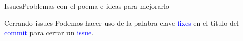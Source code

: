 \documentclass[10pt]{beamer}
\begin{document}
\begin{frame}{Issues}{Problemas con el poema e ideas para mejorarlo}

\begin{block}{Cerrando issues}
Podemos hacer uso de la palabra clave \textcolor{blue}{fixes} en el titulo del \textcolor{blue}{commit} para cerrar un \textcolor{blue}{issue}.

\begin{columns}[c]
\column{1.2in}
\vspace{0.2in}

\column{2.2in}

\end{columns}
    
\end{block}

\end{frame}
\end{document}
